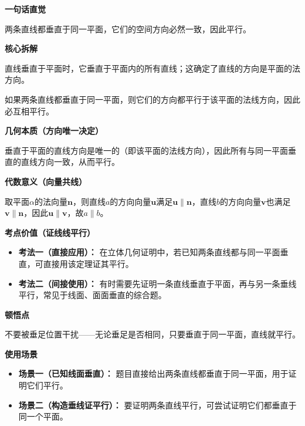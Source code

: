 \begin{explanationbox}
	\textbf{\textcolor{CExplanation}{一句话直觉}}

	两条直线都垂直于同一平面，它们的空间方向必然一致，因此平行。

	\medskip
	\textbf{\textcolor{CExplanation}{核心拆解}}
	\begin{description}[style=nextline, leftmargin=2.8em, labelsep=0.5em, itemsep=0.45em]
		\item[\textbf{要点一（线面垂直定义）：}] 直线垂直于平面时，它垂直于平面内的所有直线；这确定了直线的方向是平面的法方向。
		\item[\textbf{要点二（方向一致性）：}] 如果两条直线都垂直于同一平面，则它们的方向都平行于该平面的法线方向，因此必互相平行。
	\end{description}

	\medskip
	\textbf{\textcolor{CExplanation}{几何本质（方向唯一决定）}}

	垂直于平面的直线方向是唯一的（即该平面的法线方向），因此所有与同一平面垂直的直线方向一致，从而平行。

	\medskip
	\textbf{\textcolor{CExplanation}{代数意义（向量共线）}}

	取平面$\alpha$的法向量$\boldsymbol{n}$，则直线$a$的方向向量$\boldsymbol{u}$满足$\boldsymbol{u}\parallel\boldsymbol{n}$，直线$b$的方向向量$\boldsymbol{v}$也满足$\boldsymbol{v}\parallel\boldsymbol{n}$，因此$\boldsymbol{u}\parallel\boldsymbol{v}$，故$a\parallel b$。

	\medskip
	\textbf{\textcolor{CExplanation}{考点价值（证线线平行）}}
	\begin{itemize}[leftmargin=*, itemsep=0.5em, topsep=0.4em]
		\item \textbf{考法一（直接应用）：} 在立体几何证明中，若已知两条直线都与同一平面垂直，可直接用该定理证其平行。
		\item \textbf{考法二（间接使用）：} 有时需要先证明一条直线垂直于平面，再与另一条垂线平行，常见于线面、面面垂直的综合题。
	\end{itemize}

	\medskip
	\textbf{\textcolor{CExplanation}{顿悟点}}

	不要被垂足位置干扰——无论垂足是否相同，只要垂直于同一平面，直线就平行。

	\medskip
	\textbf{\textcolor{CExplanation}{使用场景}}
	\begin{itemize}[leftmargin=*, itemsep=0.5em, topsep=0.4em]
		\item \textbf{场景一（已知线面垂直）：} 题目直接给出两条直线都垂直于同一平面，用于证明它们平行。
		\item \textbf{场景二（构造垂线证平行）：} 要证明两条直线平行，可尝试证明它们都垂直于同一个平面。
	\end{itemize}
\end{explanationbox}
